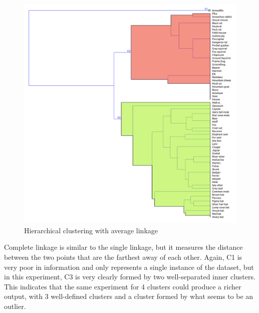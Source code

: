 \documentclass{article}
\begin{document}
\begin{figure}[htbp]
    \centering
    \includegraphics[scale=0.2]{average.png}
    \caption{Hierarchical clustering with average linkage}
    \label{fig:average_linkage}
\end{figure}

\clearpage

Complete linkage is similar to the single linkage, but it measures the distance between the two points that are the farthest away of each other. Again, C1 is very poor in information and only represents a single instance of the dataset, but in this experiment, C3 is very clearly formed by two well-separated inner clusters. This indicates that the same experiment for 4 clusters could produce a richer output, with 3 well-defined clusters and a cluster formed by what seems to be an outlier.
\end{document}
